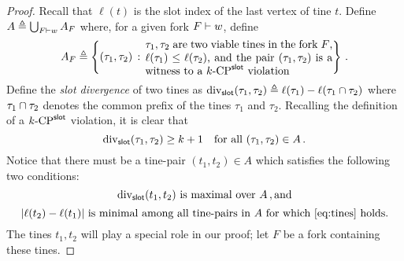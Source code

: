 \begin{proof}
  

  Recall that $\ell(t)$ is the slot index of the last vertex of tine
  $t$.  Define $A \triangleq \bigcup_{F \vdash w} A_F$ where, for a
  given fork $F \vdash w$, define
  \[
    A_F \triangleq \left\{
      (\tau_1, \tau_2) \SuchThat \parbox{60mm}{       
      $\tau_1, \tau_2$ are two viable tines in the fork $F$, 
      $\ell(\tau_1) \leq \ell(\tau_2)$, and 
      the pair $(\tau_1, \tau_2)$ is a witness to a $\kSlotCP$ violation}
     \right\}
     \,.
  \]
  Define the \emph{slot divergence} of two tines as 
  $\mathrm{div}_{\mathsf{slot}}(\tau_1, \tau_2) \triangleq \ell(\tau_1) - \ell(\tau_1 \cap \tau_2)$ 
  where $\tau_1 \cap \tau_2$ denotes the common prefix 
  of the tines $\tau_1$ and $\tau_2$. 
  Recalling the definition of a ${k}\text{-}\mathrm{CP}^{\mathsf{slot}}$ violation, it is clear that 
  \begin{equation}\label{eq:divergence}
      \mathrm{div}_{\mathsf{slot}}(\tau_1, \tau_2) \geq k + 1 \quad \text{for all } (\tau_1, \tau_2) \in A
      \,.
  \end{equation}
  Notice that there must be a tine-pair $(t_1, t_2) \in A$ which satisfies the following two conditions: 
    \begin{equation}\label{eq:tines}
      \mathrm{div}_{\mathsf{slot}}(t_1, t_2) 
      \text{ is maximal over $A$}
      \,, \text{and}
    \end{equation}
  \begin{equation}\label{eq:minimality}
    | \ell(t_2) - \ell(t_1) | 
    \text{ is minimal among all tine-pairs in $A$ 
      for which~\eqref{eq:tines} holds.}
  \end{equation}
  The tines $t_1, t_2$ will play a special role in our proof; 
  let $F$ be a fork containing these tines. 


\end{proof}
